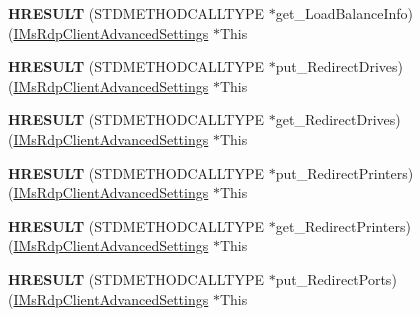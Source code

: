 \begin{DoxyCompactItemize}
{\bfseries H\+R\+E\+S\+U\+LT} (S\+T\+D\+M\+E\+T\+H\+O\+D\+C\+A\+L\+L\+T\+Y\+PE $\ast$get\+\_\+\+Load\+Balance\+Info)(\hyperlink{interface_m_s_t_s_c_lib_1_1_i_ms_rdp_client_advanced_settings}{I\+Ms\+Rdp\+Client\+Advanced\+Settings} $\ast$This
\item 
\mbox{\label{struct_m_s_t_s_c_lib_1_1_i_ms_rdp_client_advanced_settings_vtbl_a7eadd7880f02925e3f03d3de31f73050}} 
{\bfseries H\+R\+E\+S\+U\+LT} (S\+T\+D\+M\+E\+T\+H\+O\+D\+C\+A\+L\+L\+T\+Y\+PE $\ast$put\+\_\+\+Redirect\+Drives)(\hyperlink{interface_m_s_t_s_c_lib_1_1_i_ms_rdp_client_advanced_settings}{I\+Ms\+Rdp\+Client\+Advanced\+Settings} $\ast$This
\item 
\mbox{\label{struct_m_s_t_s_c_lib_1_1_i_ms_rdp_client_advanced_settings_vtbl_a6e5a2841353ffcf5fe4663e49aa59f28}} 
{\bfseries H\+R\+E\+S\+U\+LT} (S\+T\+D\+M\+E\+T\+H\+O\+D\+C\+A\+L\+L\+T\+Y\+PE $\ast$get\+\_\+\+Redirect\+Drives)(\hyperlink{interface_m_s_t_s_c_lib_1_1_i_ms_rdp_client_advanced_settings}{I\+Ms\+Rdp\+Client\+Advanced\+Settings} $\ast$This
\item 
\mbox{\label{struct_m_s_t_s_c_lib_1_1_i_ms_rdp_client_advanced_settings_vtbl_ac5f07e5be8d0ae570935063f03c44c32}} 
{\bfseries H\+R\+E\+S\+U\+LT} (S\+T\+D\+M\+E\+T\+H\+O\+D\+C\+A\+L\+L\+T\+Y\+PE $\ast$put\+\_\+\+Redirect\+Printers)(\hyperlink{interface_m_s_t_s_c_lib_1_1_i_ms_rdp_client_advanced_settings}{I\+Ms\+Rdp\+Client\+Advanced\+Settings} $\ast$This
\item 
\mbox{\label{struct_m_s_t_s_c_lib_1_1_i_ms_rdp_client_advanced_settings_vtbl_a6787becd433f258962d5b506bb8b6efe}} 
{\bfseries H\+R\+E\+S\+U\+LT} (S\+T\+D\+M\+E\+T\+H\+O\+D\+C\+A\+L\+L\+T\+Y\+PE $\ast$get\+\_\+\+Redirect\+Printers)(\hyperlink{interface_m_s_t_s_c_lib_1_1_i_ms_rdp_client_advanced_settings}{I\+Ms\+Rdp\+Client\+Advanced\+Settings} $\ast$This
\item 
\mbox{\label{struct_m_s_t_s_c_lib_1_1_i_ms_rdp_client_advanced_settings_vtbl_a9640c8b8272c8ffb0028d106cd6bff13}} 
{\bfseries H\+R\+E\+S\+U\+LT} (S\+T\+D\+M\+E\+T\+H\+O\+D\+C\+A\+L\+L\+T\+Y\+PE $\ast$put\+\_\+\+Redirect\+Ports)(\hyperlink{interface_m_s_t_s_c_lib_1_1_i_ms_rdp_client_advanced_settings}{I\+Ms\+Rdp\+Client\+Advanced\+Settings} $\ast$This

\end{DoxyCompactItemize}
